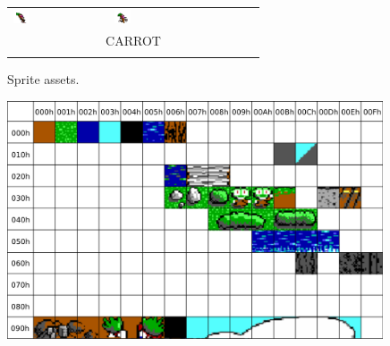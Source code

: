 \documentclass[book.tex]{subfiles}
\begin{document}
\begin{figure}[H]
\begin{table}[H]
\begin{tabularx}{\textwidth}[c]{|XXXXXX|}
  \includegraphics[width=0.18\textwidth]{screenshots_300dpi/game/sprite4e.png} & 
  \includegraphics[width=0.18\textwidth]{screenshots_300dpi/game/sprite4f.png} & & \\
  \multicolumn{6}{|c|}{CARROT}  \\ \hline
  \multicolumn{6}{c}{}     
  \end{tabularx}
  \end{table}
  \caption{Sprite assets.}
  \label{fig:sprite_assets}
 \end{figure}


\pagebreak
\begin{figure}[H] 
  \centering 
  \includegraphics[width=0.99\textwidth, frame]{screenshots_300dpi/tile16_assets.png}
\end{figure}  
\end{document}
